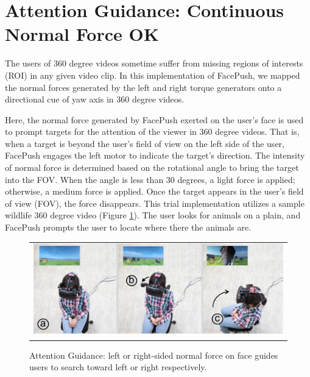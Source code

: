 \section{Attention Guidance: Continuous Normal Force OK}

The users of 360 degree videos sometime suffer from missing regions of interests (ROI) in any given video clip. In this implementation of FacePush, we mapped the normal forces generated by the left and right torque generators onto a directional cue of yaw axis in 360 degree videos. 

Here, the normal force generated by FacePush exerted on the user's face is used to prompt targets for the attention of the viewer in 360 degree videos. That is, when a target is beyond the user's field of view on the left side of the user, FacePush engages the left motor to indicate the target's direction. The intensity of normal force is determined based on the rotational angle to bring the target into the FOV. When the angle is less than 30 degrees, a light force is applied; otherwise, a medium force is applied. Once the target appears in the user's field of view (FOV), the force disappears. This trial implementation utilizes a sample wildlife 360 degree video (Figure \ref{fig:attention-guidance}). The user looks for animals on a plain, and FacePush prompts the user to locate where there the animals are.

\begin{figure}[h]
    \begin{center}
        \begin{tabular}{@{\hspace{0.1cm}}c}
            \includegraphics[width=1\linewidth]{figures/attention-guidance2}
        \end{tabular}
        \caption{Attention Guidance: left or right-sided normal force on face guides users to search toward left or right respectively.}
        \label{fig:attention-guidance}
    \end{center}
\end{figure}